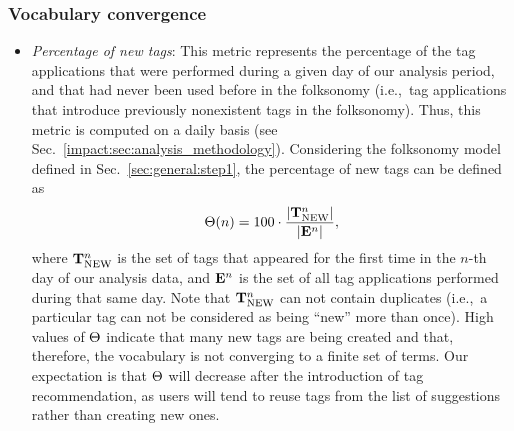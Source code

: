 \subsubsection{Vocabulary convergence}

\begin{itemize}
	\item \textit{Percentage of new tags}: This metric represents the percentage of the tag applications that were performed during a given day of our analysis period, and that had never been used before in the folksonomy (i.e.,~tag applications that introduce previously nonexistent tags in the folksonomy). Thus, this metric is computed on a daily basis (see Sec.~\ref{impact:sec:analysis_methodology}). Considering the folksonomy model defined in Sec.~\ref{sec:general:step1}, the percentage of new tags can be defined as
\begin{equation} \Theta(n) = 100 \cdot \frac{|\mathbf{T}_{\text{NEW}}^{n}|}{|\mathbf{E}^{n}|}, \label{impact:eq:percentage_of_new_tags} \end{equation}
where $\mathbf{T}_{\text{NEW}}^{n}$ is the set of tags that appeared for the first time in the $n$-th day of our analysis data, and $\mathbf{E}^{n}$ is the set of all tag applications performed during that same day. Note that $\mathbf{T}_{\text{NEW}}^{n}$ can not contain duplicates (i.e.,~a particular tag can not be considered as being ``new'' more than once). High values of $\Theta$ indicate that many new tags are being created and that, therefore, the vocabulary is not converging to a finite set of terms. Our expectation is that $\Theta$ will decrease after the introduction of tag recommendation, as users will tend to reuse tags from the list of suggestions rather than creating new ones.
		

\end{itemize}
